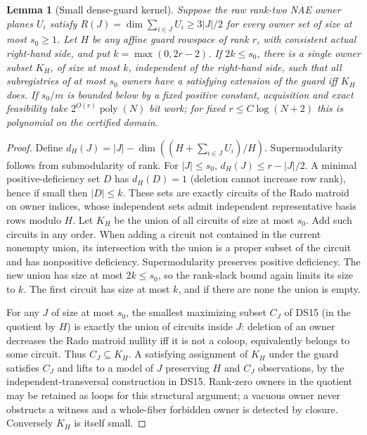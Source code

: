 \documentclass[11pt]{article}
\newtheorem{lemma}[theorem]{Lemma}
\begin{document}
\begin{lemma}[Small dense-guard kernel]\label{lem:do21-kernel}
Suppose the raw rank-two NAE owner planes $U_i$ satisfy $R(J)=\dim\sum_{i\in J}U_i\ge3|J|/2$ for every owner set of size at most $s_0\ge1$. Let $H$ be any affine guard rowspace of rank $r$, with consistent actual right-hand side, and put $k=\max(0,2r-2)$. If $2k\le s_0$, there is a single owner subset $K_H$, of size at most $k$, independent of the right-hand side, such that all subregistries of at most $s_0$ owners have a satisfying extension of the guard iff $K_H$ does. If $s_0/m$ is bounded below by a fixed positive constant, acquisition and exact feasibility take $2^{O(r)}\operatorname{poly}(N)$ bit work; for fixed $r\le C\log(N+2)$ this is polynomial on the certified domain.
\end{lemma}
\begin{proof}
Define $d_H(J)=|J|-\dim((H+\sum_{i\in J}U_i)/H)$. Supermodularity follows from submodularity of rank. For $|J|\le s_0$, $d_H(J)\le r-|J|/2$. A minimal positive-deficiency set $D$ has $d_H(D)=1$ (deletion cannot increase row rank), hence if small then $|D|\le k$. These sets are exactly circuits of the Rado matroid on owner indices, whose independent sets admit independent representative basis rows modulo $H$. Let $K_H$ be the union of all circuits of size at most $s_0$. Add such circuits in any order. When adding a circuit not contained in the current nonempty union, its intersection with the union is a proper subset of the circuit and has nonpositive deficiency. Supermodularity preserves positive deficiency. The new union has size at most $2k\le s_0$, so the rank-slack bound again limits its size to $k$. The first circuit has size at most $k$, and if there are none the union is empty.

For any $J$ of size at most $s_0$, the smallest maximizing subset $C_J$ of DS15 (in the quotient by $H$) is exactly the union of circuits inside $J$: deletion of an owner decreases the Rado matroid nullity iff it is not a coloop, equivalently belongs to some circuit. Thus $C_J\subseteq K_H$. A satisfying assignment of $K_H$ under the guard satisfies $C_J$ and lifts to a model of $J$ preserving $H$ and $C_J$ observations, by the independent-transversal construction in DS15. Rank-zero owners in the quotient may be retained as loops for this structural argument; a vacuous owner never obstructs a witness and a whole-fiber forbidden owner is detected by closure. Conversely $K_H$ is itself small.


\end{proof}
\end{document}
